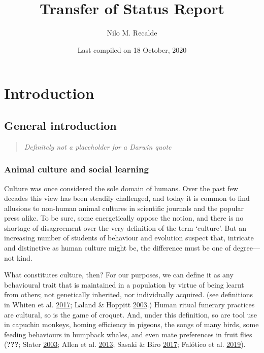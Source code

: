 \documentclass[]{report}
\title{Transfer of Status Report}
\author{Nilo M. Recalde}
\date{Last compiled on 18 October, 2020}
\begin{document}
\maketitle

{
\hypersetup{linkcolor=}
\setcounter{tocdepth}{2}
\tableofcontents
}
\listoffigures
\hypertarget{introduction}{%
\chapter{Introduction}\label{introduction}}

\hypertarget{general-introduction}{%
\section{General introduction}\label{general-introduction}}

\begin{quote}
\emph{Definitely not a placeholder for a Darwin quote}
\end{quote}

\hypertarget{animal-culture-and-social-learning}{%
\subsection{Animal culture and social
learning}\label{animal-culture-and-social-learning}}

Culture was once considered the sole domain of humans. Over the past few
decades this view has been steadily challenged, and today it is common
to find allusions to non-human animal cultures in scientific journals
and the popular press alike. To be sure, some energetically oppose the
notion, and there is no shortage of disagreement over the very
definition of the term `culture'. But an increasing number of students
of behaviour and evolution suspect that, intricate and distinctive as
human culture might be, the difference must be one of degree---not kind.

What constitutes culture, then? For our purposes, we can define it as
any behavioural trait that is maintained in a population by virtue of
being learnt from others; not genetically inherited, nor individually
acquired. (see definitions in Whiten et al.
\protect\hyperlink{ref-Whiten2017}{2017}; Laland \& Hoppitt
\protect\hyperlink{ref-Laland2003}{2003}.) Human ritual funerary
practices are cultural, so is the game of croquet. And, under this
definition, so are tool use in capuchin monkeys, homing efficiency in
pigeons, the songs of many birds, some feeding behaviours in humpback
whales, and even mate preferences in fruit flies ({\textbf{???}}; Slater
\protect\hyperlink{ref-Slater2003}{2003}; Allen et al.
\protect\hyperlink{ref-Allen2013a}{2013}; Sasaki \& Biro
\protect\hyperlink{ref-Sasaki2017a}{2017}; Falótico et al.
\protect\hyperlink{ref-Falotico2019}{2019}).
\end{document}
